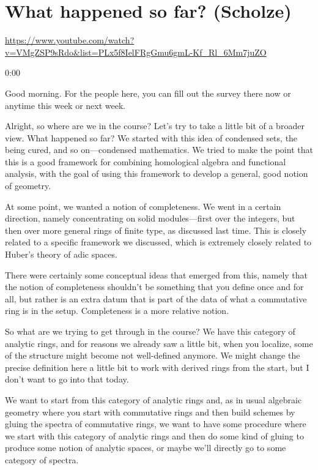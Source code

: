 
\section{\ufs What happened so far? (Scholze)}
\label{sec:12-what-happened}

\url{https://www.youtube.com/watch?v=VMgZSP9sRdo&list=PLx5f8IelFRgGmu6gmL-Kf_Rl_6Mm7juZO}
\renewcommand{\yt}[2]{\href{https://www.youtube.com/watch?v=VMgZSP9sRdo&list=PLx5f8IelFRgGmu6gmL-Kf_Rl_6Mm7juZO&t=#1}{#2}}
\vspace{1em}

\begin{unfinished}{0:00}

Good morning. For the people here, you can fill out the survey there now or anytime this week or next week.

Alright, so where are we in the course? Let's try to take a little bit of a broader view. What happened so far? We started with this idea of condensed sets, the being cured, and so on---condensed mathematics. We tried to make the point that this is a good framework for combining homological algebra and functional analysis, with the goal of using this framework to develop a general, good notion of geometry.

At some point, we wanted a notion of completeness. We went in a certain direction, namely concentrating on solid modules---first over the integers, but then over more general rings of finite type, as discussed last time. This is closely related to a specific framework we discussed, which is extremely closely related to Huber's theory of adic spaces.

There were certainly some conceptual ideas that emerged from this, namely that the notion of completeness shouldn't be something that you define once and for all, but rather is an extra datum that is part of the data of what a commutative ring is in the setup. Completeness is a more relative notion.

So what are we trying to get through in the course? We have this category of analytic rings, and for reasons we already saw a little bit, when you localize, some of the structure might become not well-defined anymore. We might change the precise definition here a little bit to work with derived rings from the start, but I don't want to go into that today.

We want to start from this category of analytic rings and, as in usual algebraic geometry where you start with commutative rings and then build schemes by gluing the spectra of commutative rings, we want to have some procedure where we start with this category of analytic rings and then do some kind of gluing to produce some notion of analytic spaces, or maybe we'll directly go to some category of spectra.


\end{unfinished}
